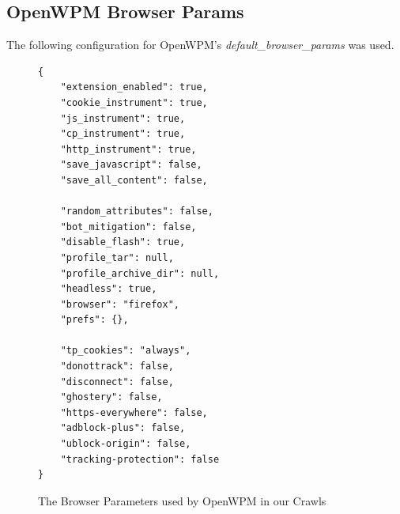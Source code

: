 \documentclass[
    fontsize=12pt,
    headings=small,
    parskip=half,
    bibliography=totoc,
    numbers=noenddot,
    open=any
    ]{scrreprt}
\begin{document}
\begin{appendices}

\chapter{OpenWPM Browser Params}
The following configuration for OpenWPM's \textit{default\_browser\_params} was used.


\begin{figure}
\label{app:params}
\begin{verbatim}
{
    "extension_enabled": true,
    "cookie_instrument": true,
    "js_instrument": true,
    "cp_instrument": true,
    "http_instrument": true,
    "save_javascript": false,
    "save_all_content": false,

    "random_attributes": false,
    "bot_mitigation": false,
    "disable_flash": true,
    "profile_tar": null,
    "profile_archive_dir": null,
    "headless": true,
    "browser": "firefox",
    "prefs": {},

    "tp_cookies": "always",
    "donottrack": false,
    "disconnect": false,
    "ghostery": false,
    "https-everywhere": false,
    "adblock-plus": false,
    "ublock-origin": false,
    "tracking-protection": false
}
\end{verbatim}
\caption{The Browser Parameters used by OpenWPM in our Crawls}
\end{figure}


\end{appendices}

\clearpage

\printbibliography
\end{document}
